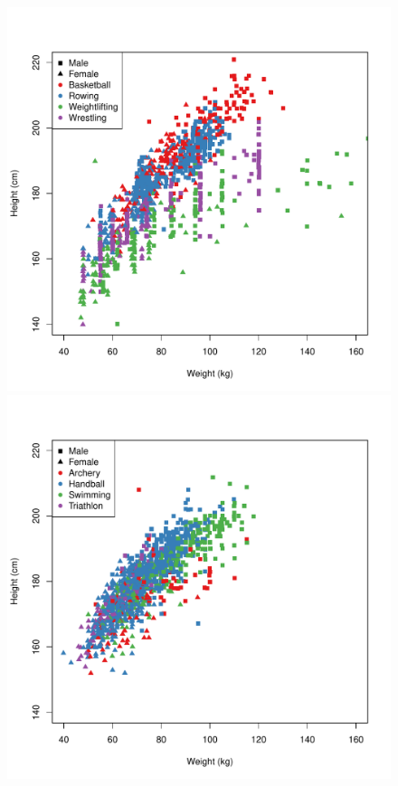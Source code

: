 \begin{center}
  \begin{figure}
    \begin{minipage}{0.45\textwidth}
      \begin{center}
        \includegraphics[scale=0.40]{../graphics/basketball.pdf}
      \end{center}
    \end{minipage}
    \hspace{0.05\textwidth}
    \begin{minipage}{0.45\textwidth}
      \begin{center}
        \includegraphics[scale=0.40]{../graphics/swimming.pdf}

\end{center}
\end{minipage}
\end{figure}
\end{center}
